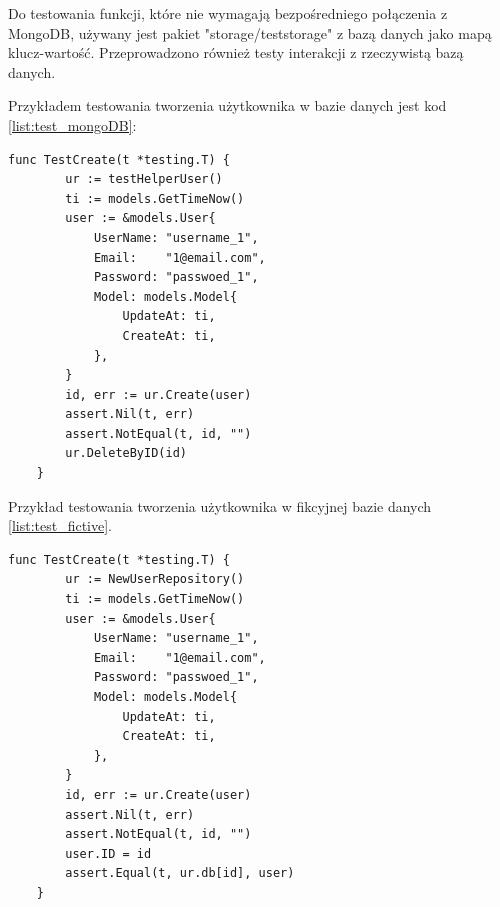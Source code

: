 Do testowania funkcji, które nie wymagają bezpośredniego połączenia z MongoDB, używany jest pakiet "storage/teststorage" z bazą danych jako mapą klucz-wartość. Przeprowadzono również testy interakcji z rzeczywistą bazą danych.

Przykładem testowania tworzenia użytkownika w bazie danych jest kod \ref{list:test_mongoDB}:
\begin{lstlisting}[label=list:test_mongoDB,caption=Kod testowania tworzenia użytkownika w MongoDB,basicstyle=\tiny\ttfamily]
    func TestCreate(t *testing.T) {
        ur := testHelperUser()
        ti := models.GetTimeNow()
        user := &models.User{
            UserName: "username_1",
            Email:    "1@email.com",
            Password: "passwoed_1",
            Model: models.Model{
                UpdateAt: ti,
                CreateAt: ti,
            },
        }
        id, err := ur.Create(user)
        assert.Nil(t, err)
        assert.NotEqual(t, id, "")
        ur.DeleteByID(id)
    }
\end{lstlisting}

Przykład testowania tworzenia użytkownika w fikcyjnej bazie danych \ref{list:test_fictive}.
\begin{lstlisting}[label=list:test_fictive,caption=Kod testowania tworzenia użytkownika w fikcyjnej bazie danych,basicstyle=\tiny\ttfamily]
    func TestCreate(t *testing.T) {
        ur := NewUserRepository()
        ti := models.GetTimeNow()
        user := &models.User{
            UserName: "username_1",
            Email:    "1@email.com",
            Password: "passwoed_1",
            Model: models.Model{
                UpdateAt: ti,
                CreateAt: ti,
            },
        }
        id, err := ur.Create(user)
        assert.Nil(t, err)
        assert.NotEqual(t, id, "")
        user.ID = id
        assert.Equal(t, ur.db[id], user)
    }
\end{lstlisting}

